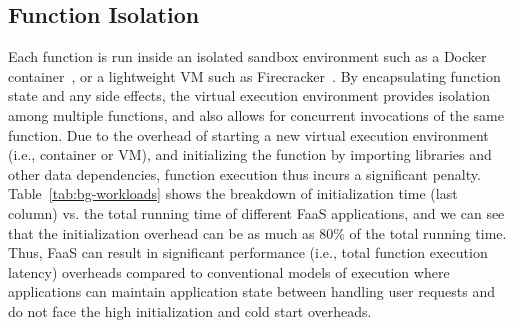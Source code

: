






%
%

\subsection{Function Isolation}

Each function is run inside an isolated sandbox environment such as a Docker container~\cite{docker-main}, or a lightweight VM such as Firecracker~\cite{firecracker-nsdi20}. 
By encapsulating function state and any side effects, the virtual execution environment provides isolation among multiple functions, and also allows for concurrent invocations of the same function. 
Due to the overhead of starting a new virtual execution environment (i.e., container or VM), and initializing the function by importing libraries and other data dependencies, function execution thus incurs a significant  penalty.
Table~\ref{tab:bg-workloads} shows the breakdown of initialization time (last column) vs. the total running time of different FaaS applications, and we can see that the initialization overhead can be as much as 80\% of the total running time. 
Thus, FaaS can result in significant performance (i.e., total function execution latency) overheads compared to conventional models of execution where applications can maintain application state between handling user requests and do not face the high initialization and cold start overheads.



